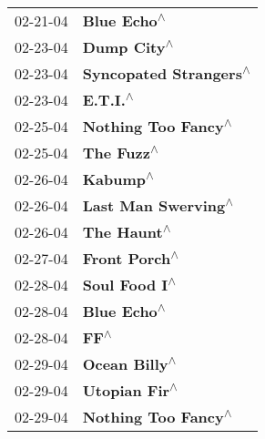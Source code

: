 \begin{supertabular}{p{0.25\columnwidth}p{0.75\columnwidth}}
 02-21-04 &                                                                \textbf{Blue Echo\textsuperscript{$\wedge$}} \\
 02-23-04 &                                                                \textbf{Dump City\textsuperscript{$\wedge$}} \\
 02-23-04 &                                                     \textbf{Syncopated Strangers\textsuperscript{$\wedge$}} \\
 02-23-04 &                                                                   \textbf{E.T.I.\textsuperscript{$\wedge$}} \\
 02-25-04 &                                                        \textbf{Nothing Too Fancy\textsuperscript{$\wedge$}} \\
 02-25-04 &                                                                 \textbf{The Fuzz\textsuperscript{$\wedge$}} \\
 02-26-04 &                                                                   \textbf{Kabump\textsuperscript{$\wedge$}} \\
 02-26-04 &                                                        \textbf{Last Man Swerving\textsuperscript{$\wedge$}} \\
 02-26-04 &                                                                \textbf{The Haunt\textsuperscript{$\wedge$}} \\
 02-27-04 &                                                              \textbf{Front Porch\textsuperscript{$\wedge$}} \\
 02-28-04 &                                                              \textbf{Soul Food I\textsuperscript{$\wedge$}} \\
 02-28-04 &                                                                \textbf{Blue Echo\textsuperscript{$\wedge$}} \\
 02-28-04 &                                                                       \textbf{FF\textsuperscript{$\wedge$}} \\
 02-29-04 &                                                              \textbf{Ocean Billy\textsuperscript{$\wedge$}} \\
 02-29-04 &                                                              \textbf{Utopian Fir\textsuperscript{$\wedge$}} \\
 02-29-04 &                                                        \textbf{Nothing Too Fancy\textsuperscript{$\wedge$}} \\

\end{supertabular}
